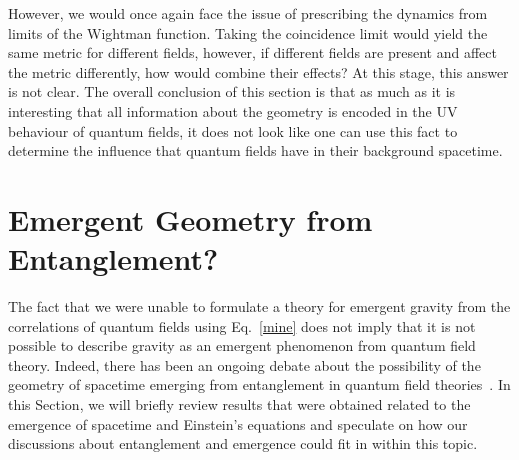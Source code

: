 \documentclass[letterpaper,12pt,titlepage,oneside,final]{book}
\begin{document}
However, we would once again face the issue of prescribing the dynamics from limits of the Wightman function. Taking the coincidence limit would yield the same metric for different fields, however, if different fields are present and affect the metric differently, how would combine their effects? At this stage, this answer is not clear. The overall conclusion of this section is that as much as it is interesting that all information about the geometry is encoded in the UV behaviour of quantum fields, it does not look like one can use this fact to determine the influence that quantum fields have in their background spacetime.


\section{Emergent Geometry from Entanglement?}\label{sec:speculation}

The fact that we were unable to formulate a theory for emergent gravity from the correlations of quantum fields using Eq.~\eqref{mine} does not imply that it is not possible to describe gravity as an emergent phenomenon from quantum field theory. Indeed, there has been an ongoing debate about the possibility of the geometry of spacetime emerging from entanglement in quantum field theories~\cite{VanRaamsdonkEmergent2010,ADSCFTemergent,Cao1,Cao2,emergent2021,Gui2023}. In this Section, we will briefly review results that were obtained related to the emergence of spacetime and Einstein's equations and speculate on how our discussions about entanglement and emergence could fit in within this topic.
\end{document}
